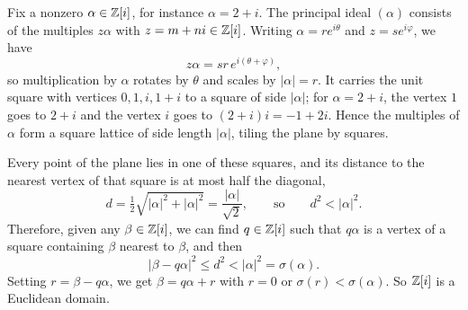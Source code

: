 \documentclass[reqno,11pt]{amsart}
\begin{document}
\begin{example}
Fix a nonzero $\alpha\in\mathbb{Z}[i]$, for instance $\alpha=2+i$.
The principal ideal $(\alpha)$ consists of the multiples $z\alpha$
with $z=m+ni\in\mathbb{Z}[i]$. Writing $\alpha=re^{i\theta}$ and
$z=se^{i\varphi}$, we have
\[
  z\alpha=sr\,e^{i(\theta+\varphi)},
\]
so multiplication by $\alpha$ rotates by $\theta$ and scales by
$|\alpha|=r$. It carries the unit square with vertices
$0,1,i,1+i$ to a square of side $|\alpha|$; for $\alpha=2+i$,
the vertex $1$ goes to $2+i$ and the vertex $i$ goes to
$(2+i)i=-1+2i$. Hence the multiples of $\alpha$ form a square
lattice of side length $|\alpha|$, tiling the plane by squares.

\begin{center}
\end{center}

Every point of the plane lies in one of these squares, and its
distance to the nearest vertex of that square is at most half
the diagonal,
\[
  d=\tfrac12\sqrt{|\alpha|^2+|\alpha|^2}=\frac{|\alpha|}{\sqrt2},
  \qquad\text{so}\qquad d^2<|\alpha|^2.
\]
Therefore, given any $\beta\in\mathbb{Z}[i]$, we can find $q\in\mathbb{Z}[i]$ such
that $q\alpha$ is a vertex of a square containing $\beta$ nearest to
$\beta$, and then
\[
  |\beta-q\alpha|^2\leq d^2<|\alpha|^2=\sigma(\alpha).
\]
Setting $r=\beta-q\alpha$, we get $\beta=q\alpha+r$ with $r=0$ or
$\sigma(r)<\sigma(\alpha)$. So $\mathbb{Z}[i]$ is a Euclidean domain.
\end{example}
\end{document}
